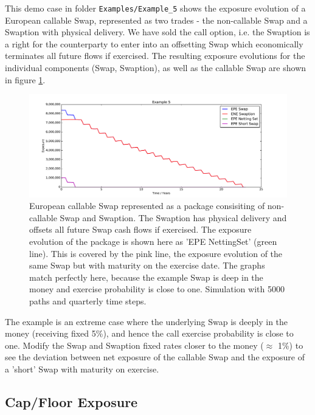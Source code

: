 \documentclass[12pt, a4paper]{article}
\begin{document}
This demo case in folder {\tt Examples/Example\_5} shows the exposure evolution of a European callable Swap, represented
as two trades - the non-callable Swap and a Swaption with physical delivery. We have sold the call option, i.e. the
Swaption is a right for the counterparty to enter into an offsetting Swap which economically terminates all future flows
if exercised. The resulting exposure evolutions for the individual components (Swap, Swaption), as well as the callable
Swap are shown in figure \ref{fig_4}.
\begin{figure}[h!]
\begin{center}
\includegraphics[scale=0.45]{mpl_callable_swap.pdf}
\end{center}
\caption{European callable Swap represented as a package consisiting of non-callable Swap and Swaption. The Swaption has
  physical delivery and offsets all future Swap cash flows if exercised. The exposure evolution of the package is shown
  here as 'EPE NettingSet' (green line). This is covered by the pink line, the exposure evolution of the same Swap but
  with maturity on the exercise date. The graphs match perfectly here, because the example Swap is deep in the money and
  exercise probability is close to one. Simulation with 5000 paths and quarterly time steps.}
\label{fig_4}
\end{figure}
The example is an extreme case where the underlying Swap is deeply in the money (receiving fixed 5\%), and hence the
call exercise probability is close to one. Modify the Swap and Swaption fixed rates closer to the money ($\approx$ 1\%)
to see the deviation between net exposure of the callable Swap and the exposure of a 'short' Swap with maturity on
exercise.

\subsection{Cap/Floor Exposure}\label{sec:capfloor}
\end{document}
